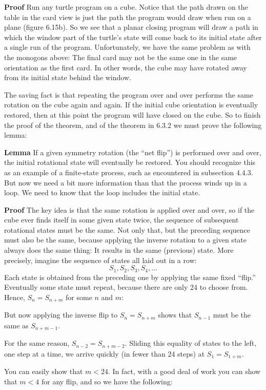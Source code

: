 \documentclass{book}
\begin{document}
\noindent \textbf{Proof} Run any turtle program on a cube. Notice that the path drawn
on the table in the card view is just the path the program would draw
when run on a plane (figure 6.15b). So we see that a planar closing
program will draw a path in which the window part of the turtle's state
will come back to its initial state after a single run of the program.
Unfortunately, we have the same problem as with the monogons above:
The final card may not be the same one in the same orientation as the
first card. In other words, the cube may have rotated away from its
initial state behind the window.

The saving fact is that repeating the program over and over performs the
same rotation on the cube again and again. If the initial cube orientation
is eventually restored, then at this point the program will have closed
on the cube. So to finish the proof of the theorem, and of the theorem
in 6.3.2 we must prove the following lemma:

\noindent \textbf{Lemma} If a given symmetry rotation (the ``net flip'') is performed over
and over, the initial rotational state will eventually be restored.
You should recognize this as an example of a finite-state process, such as
encountered in subsection 4.4.3. But now we need a bit more information
than that the process winds up in a loop. We need to know that the
loop includes the initial state.

\noindent \textbf{Proof} The key idea is that the same rotation is applied over and over,
so if the cube ever finds itself in some given state twice, the sequence of
subsequent rotational states must be the same. Not only that, but the
preceding sequence must also be the same, because applying the inverse
rotation to a given state always does the same thing: It results in the
same (previous) state. More precisely, imagine the sequence of states all
laid out in a row:
$$S_1,S_2,S_3,S_4,... $$
 Each state is obtained from the preceding one by applying the same
fixed ``flip.'' Eventually some state must repeat, because there are only
24 to choose from. Hence, $S_n = S_{n+m}$ for some $n$ and $m$:

But now applying the inverse flip to $S_n = S_{n+m}$ shows that $S_{n-1}$ must
be the same as $S_{n+m-1}$.

For the same reason, $S_{n-2} = S_{n+m-2}$. Sliding this equality of states
to the left, one step at a time, we arrive quickly (in fewer than 24 steps)
at $S_1 = S_{1+m}$.

You can easily show that $m < 24$. In fact, with a good deal of work
you can show that $m < 4$ for any flip, and so we have the following:
\end{document}
